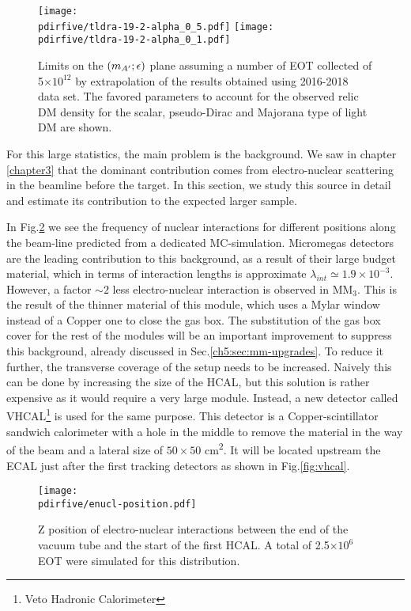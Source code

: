 \begin{figure}[bht!]
  \centering
  \texttt{[image: \\pdirfive/tldra-19-2-alpha\_0\_5.pdf]}
  \texttt{[image: \\pdirfive/tldra-19-2-alpha\_0\_1.pdf]}
  \caption[Sensitivity projection for invisible mode 2021]{Limits on the $(m_{A'};\epsilon)$ plane assuming a number of EOT collected of 5$\times 10^{12}$ by extrapolation of the results obtained using 2016-2018 data set. The favored parameters to account for the observed relic DM density for the scalar, pseudo-Dirac and Majorana type of light DM are shown.}
  \label{fig:dm-sens-proj}
\end{figure}

For this large statistics, the main problem is the background.  We saw in chapter \ref{chapter3} that the dominant contribution comes from electro-nuclear scattering in the beamline before the target. In this section, we study this source in detail and estimate its contribution to the expected larger sample.

In Fig.\ref{fig:enucl-position} we see the frequency of nuclear interactions for different positions along the beam-line predicted from a dedicated MC-simulation. Micromegas detectors are the leading contribution to this background, as a result of their large budget material, which in terms of interaction lengths is approximate $\lambda_{int} \simeq 1.9 \times 10^{-3}$. However, a factor $\sim 2$ less electro-nuclear interaction is observed in MM$_3$. This is the result of the thinner material of this module, which uses a Mylar window instead of a Copper one to close the gas box. The substitution of the gas box cover for the rest of the modules will be an important improvement to suppress this background, already discussed in Sec.\ref{ch5:sec:mm-upgrades}. To reduce it further, the transverse coverage of the setup needs to be increased. Naively this can be done by increasing the size of the HCAL, but this solution is rather expensive as it would require a very large module. Instead, a new detector called VHCAL\footnote{Veto Hadronic Calorimeter} is used for the same purpose. This detector is a Copper-scintillator sandwich calorimeter with a hole in the middle to remove the material in the way of the beam and a lateral size of $50\times50$ \si{\centi\meter\squared}. It will be located upstream the ECAL just after the first tracking detectors as shown in Fig.\ref{fig:vhcal}.
\begin{figure}[bth!]
  \centering
  \texttt{[image: \\pdirfive/enucl-position.pdf]}
  \caption[electro-nuclear interaction position]{Z position of electro-nuclear interactions between the end of the vacuum tube and the start of the first HCAL. A total of 2.5$\times 10^6$ EOT were simulated for this distribution.}
  \label{fig:enucl-position}
\end{figure}

